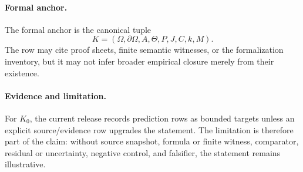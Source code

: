 \paragraph{Formal anchor.}
The formal anchor is the canonical tuple
\[
  K=(\Omega,\partial\Omega,A,\Theta,P,J,C,k,M).
\]
The row may cite proof sheets, finite semantic witnesses, or the formalization
inventory, but it may not infer broader empirical closure merely from their
existence.

\paragraph{Evidence and limitation.}
For \(K_0\), the current release records prediction rows as bounded
targets unless an explicit source/evidence row upgrades the statement. The
limitation is therefore part of the claim: without source snapshot, formula or
finite witness, comparator, residual or uncertainty, negative control, and
falsifier, the statement remains illustrative.

